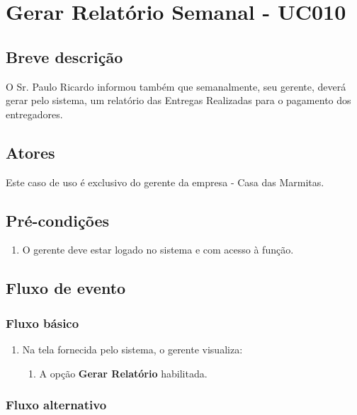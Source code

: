 \chapter{Gerar Relatório Semanal - UC010} \label{uc010}

\section{Breve descrição}

O Sr. Paulo Ricardo informou também que semanalmente, seu gerente, deverá gerar pelo sistema, um relatório das Entregas Realizadas para o pagamento dos entregadores.

\section{Atores}

Este caso de uso é exclusivo do gerente da empresa - Casa das Marmitas.

\section{Pré-condições}

\begin{enumerate}
	\item O gerente deve estar logado no sistema e com acesso à função.
\end{enumerate}

\section{Fluxo de evento}

\subsection{Fluxo básico}

\begin{enumerate}
	\item Na tela fornecida pelo sistema, o gerente visualiza:
	\begin{enumerate}
		\item A opção \textbf{Gerar Relatório} habilitada.
	\end{enumerate}		
\end{enumerate}

\subsection{Fluxo alternativo}

